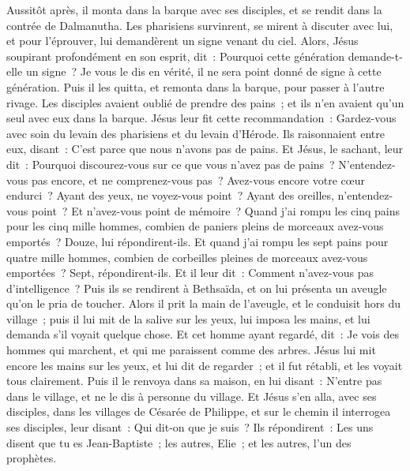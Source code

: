\begin{multicols}{2}
Aussitôt après, il monta dans la barque avec ses disciples, et se rendit dans la contrée de Dalmanutha.
Les pharisiens survinrent, se mirent à discuter avec lui, et pour l'éprouver, lui demandèrent un signe venant du ciel.
Alors, Jésus soupirant profondément en son esprit, dit~: Pourquoi cette génération demande-t-elle un signe~? Je vous le dis en vérité, il ne sera point donné de signe à cette génération.
Puis il les quitta, et remonta dans la barque, pour passer à l'autre rivage.
Les disciples avaient oublié de prendre des pains~; et ils n'en avaient qu'un seul avec eux dans la barque.
Jésus leur fit cette recommandation~: Gardez-vous avec soin du levain des pharisiens et du levain d'Hérode.
Ils raisonnaient entre eux, disant~: C'est parce que nous n'avons pas de pains.
Et Jésus, le sachant, leur dit~: Pourquoi discourez-vous sur ce que vous n'avez pas de pains~? N'entendez-vous pas encore, et ne comprenez-vous pas~?
Avez-vous encore votre cœur endurci~? Ayant des yeux, ne voyez-vous point~? Ayant des oreilles, n'entendez-vous point~? Et n'avez-vous point de mémoire~?
Quand j'ai rompu les cinq pains pour les cinq mille hommes, combien de paniers pleins de morceaux avez-vous emportés~? Douze, lui répondirent-ils.
Et quand j'ai rompu les sept pains pour quatre mille hommes, combien de corbeilles pleines de morceaux avez-vous emportées~? Sept, répondirent-ils.
Et il leur dit~: Comment n'avez-vous pas d'intelligence~?
Puis ils se rendirent à Bethsaïda, et on lui présenta un aveugle qu'on le pria de toucher.
Alors il prit la main de l'aveugle, et le conduisit hors du village~; puis il lui mit de la salive sur les yeux, lui imposa les mains, et lui demanda s'il voyait quelque chose.
Et cet homme ayant regardé, dit~: Je vois des hommes qui marchent, et qui me paraissent comme des arbres.
Jésus lui mit encore les mains sur les yeux, et lui dit de regarder~; et il fut rétabli, et les voyait tous clairement.
Puis il le renvoya dans sa maison, en lui disant~: N'entre pas dans le village, et ne le dis à personne du village.
Et Jésus s'en alla, avec ses disciples, dans les villages de Césarée de Philippe, et sur le chemin il interrogea ses disciples, leur disant~: Qui dit-on que je suis~?
Ils répondirent~: Les uns disent que tu es Jean-Baptiste~; les autres, Elie~; et les autres, l'un des prophètes.

\end{multicols}
